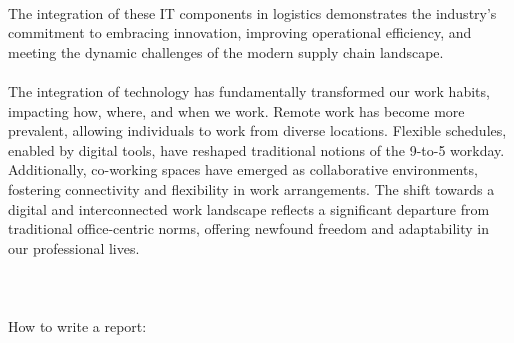 \documentclass{report}
\begin{document}
\\
The integration of these IT components in logistics demonstrates the industry's commitment to embracing innovation, improving operational efficiency, and meeting the dynamic challenges of the modern supply chain landscape.
\\
\\
The integration of technology has fundamentally transformed our work habits, impacting how, where, and when we work. Remote work has become more prevalent, allowing individuals to work from diverse locations. Flexible schedules, enabled by digital tools, have reshaped traditional notions of the 9-to-5 workday. Additionally, co-working spaces have emerged as collaborative environments, fostering connectivity and flexibility in work arrangements. The shift towards a digital and interconnected work landscape reflects a significant departure from traditional office-centric norms, offering newfound freedom and adaptability in our professional lives.
\\
\\
\\
\\
How to write a report:
\\
\end{document}
